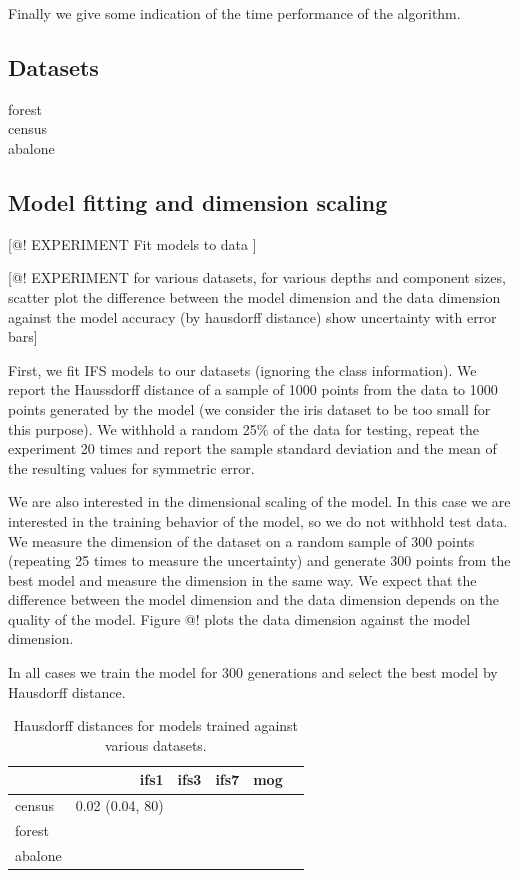 \documentclass[10pt,a4paper,oneside]{article}
\theoremstyle{definition}
\begin{document}
Finally we give some indication of the time performance of the algorithm.

\subsection*{Datasets}

\begin{description}
  \item[forest]
  \item[census]
  \item[abalone]
\end{description}

\subsection*{Model fitting and dimension scaling}

[@! EXPERIMENT Fit models to data ]

[@! EXPERIMENT for various datasets, for various depths and component sizes, scatter plot the difference between the model dimension and the data dimension against the model accuracy (by hausdorff distance) show uncertainty with error bars]

First, we fit IFS models to our datasets (ignoring the class information). We report the Haussdorff distance of a sample of 1000 points from the data to 1000 points generated by the model (we consider the iris dataset to be too small for this purpose). We withhold a random 25\% of the data for testing, repeat the experiment 20 times and report the sample standard deviation and the mean of the resulting values for symmetric error.

We are also interested in the dimensional scaling of the model. In this case we are interested in the training behavior of the model, so we do not withhold test data. We measure the dimension of the dataset on a random sample of 300 points (repeating 25 times to measure the uncertainty) and generate 300 points from the best model and measure the dimension in the same way. We expect that the difference between the model dimension and the data dimension depends on the quality of the model. Figure @! plots the data dimension against the model dimension. 


In all cases we train the model for 300 generations and select the best model by Hausdorff distance. 

\begin{table}
\begin{tabular}{l | r r r r | r |}
\hline
 & ifs1 & ifs3 & ifs7 & mog \\
\hline
census & 0.02 (0.04, 80) & & & & \\
forest & & & & & \\
abalone & & & & & \\
\hline

\end{tabular}
\caption{Hausdorff distances for models trained against various datasets.}
\label{tablelabel}
\end{table}
\end{document}
